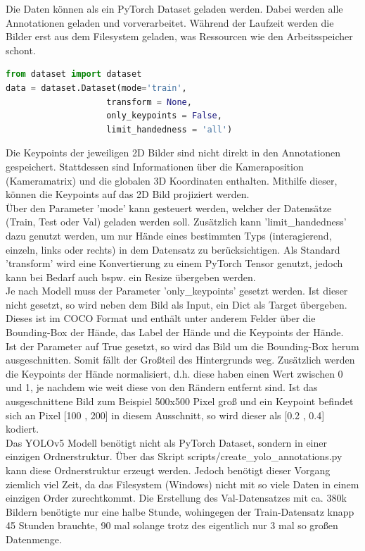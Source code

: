 Die Daten können als ein PyTorch Dataset geladen werden.
Dabei werden alle Annotationen geladen und vorverarbeitet. 
Während der Laufzeit werden die Bilder erst aus dem Filesystem geladen, was Ressourcen wie den Arbeitsspeicher schont. \\
\begin{lstlisting}[language=Python,caption={Dataset},label={lst:dataset},captionpos=b,showstringspaces=false, basicstyle=\small]
from dataset import dataset
data = dataset.Dataset(mode='train',
                    transform = None,
                    only_keypoints = False,
                    limit_handedness = 'all')
\end{lstlisting}
Die Keypoints der jeweiligen 2D Bilder sind nicht direkt in den Annotationen gespeichert.
Stattdessen sind Informationen über die Kameraposition (Kameramatrix) und die globalen 3D Koordinaten enthalten.
Mithilfe dieser, können die Keypoints auf das 2D Bild projiziert werden.\\
Über den Parameter 'mode' kann gesteuert werden, welcher der Datensätze (Train, Test oder Val) geladen werden soll.
Zusätzlich kann 'limit\_handedness' dazu genutzt werden, um nur Hände eines bestimmten Typs (interagierend, einzeln, links oder rechts) in dem Datensatz zu berücksichtigen.
Als Standard 'transform' wird eine Konvertierung zu einem PyTorch Tensor genutzt, jedoch kann bei Bedarf auch bspw. ein Resize übergeben werden.\\
Je nach Modell muss der Parameter 'only\_keypoints' gesetzt werden.
Ist dieser nicht gesetzt, so wird neben dem Bild als Input, ein Dict als Target übergeben.
Dieses ist im COCO Format \cite{coco} und enthält unter anderem Felder über die Bounding-Box der Hände, das Label der Hände und die Keypoints der Hände.\\
Ist der Parameter auf True gesetzt, so wird das Bild um die Bounding-Box herum ausgeschnitten.
Somit fällt der Großteil des Hintergrunds weg.
Zusätzlich werden die Keypoints der Hände normalisiert, d.h. diese haben einen Wert zwischen 0 und 1, je nachdem wie weit diese von den Rändern entfernt sind.
Ist das ausgeschnittene Bild zum Beispiel 500x500 Pixel groß und ein Keypoint befindet sich an Pixel [100 , 200] in diesem Ausschnitt, so wird dieser als [0.2 , 0.4] kodiert.\\

Das YOLOv5 Modell benötigt nicht als PyTorch Dataset, sondern in einer einzigen Ordnerstruktur.
Über das Skript scripts/create\_yolo\_annotations.py kann diese Ordnerstruktur erzeugt werden.
Jedoch benötigt dieser Vorgang ziemlich viel Zeit, da das Filesystem (Windows) nicht mit so viele Daten in einem einzigen Order zurechtkommt.
Die Erstellung des Val-Datensatzes mit ca. 380k Bildern benötigte nur eine halbe Stunde, wohingegen der Train-Datensatz knapp 45 Stunden brauchte, 90 mal solange trotz des eigentlich nur 3 mal so großen Datenmenge.

